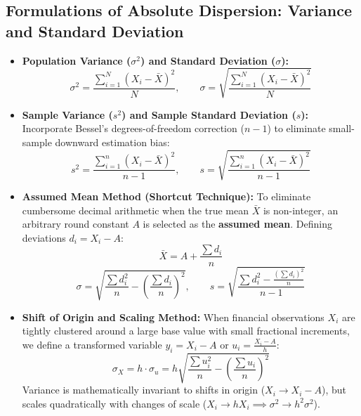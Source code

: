 \subsection{Formulations of Absolute Dispersion: Variance and Standard Deviation}
\begin{formulabox}
\begin{itemize}[leftmargin=*, noitemsep]
    \item \textbf{Population Variance ($\sigma^2$) and Standard Deviation ($\sigma$):}
    \begin{equation}
        \sigma^2 = \frac{\sum_{i=1}^{N} (X_i - \bar{X})^2}{N}, \qquad \sigma = \sqrt{\frac{\sum_{i=1}^{N} (X_i - \bar{X})^2}{N}}
    \end{equation}

    \item \textbf{Sample Variance ($s^2$) and Sample Standard Deviation ($s$):}
    Incorporate Bessel's degrees-of-freedom correction ($n - 1$) to eliminate small-sample downward estimation bias:
    \begin{equation}
        s^2 = \frac{\sum_{i=1}^{n} (X_i - \bar{X})^2}{n - 1}, \qquad s = \sqrt{\frac{\sum_{i=1}^{n} (X_i - \bar{X})^2}{n - 1}}
    \end{equation}

    \item \textbf{Assumed Mean Method (Shortcut Technique):}
    To eliminate cumbersome decimal arithmetic when the true mean $\bar{X}$ is non-integer, an arbitrary round constant $A$ is selected as the \textbf{assumed mean}. Defining deviations $d_i = X_i - A$:
    \begin{equation}
        \bar{X} = A + \frac{\sum d_i}{n}
    \end{equation}
    \begin{equation}
        \sigma = \sqrt{\frac{\sum d_i^2}{n} - \left(\frac{\sum d_i}{n}\right)^2}, \qquad s = \sqrt{\frac{\sum d_i^2 - \frac{(\sum d_i)^2}{n}}{n - 1}}
    \end{equation}

    \item \textbf{Shift of Origin and Scaling Method:}
    When financial observations $X_i$ are tightly clustered around a large base value with small fractional increments, we define a transformed variable $y_i = X_i - A$ or $u_i = \frac{X_i - A}{h}$:
    \begin{equation}
        \sigma_X = h \cdot \sigma_u = h \sqrt{\frac{\sum u_i^2}{n} - \left(\frac{\sum u_i}{n}\right)^2}
    \end{equation}
    Variance is mathematically invariant to shifts in origin ($X_i \to X_i - A$), but scales quadratically with changes of scale ($X_i \to h X_i \implies \sigma^2 \to h^2 \sigma^2$).
\end{itemize}
\end{formulabox}

